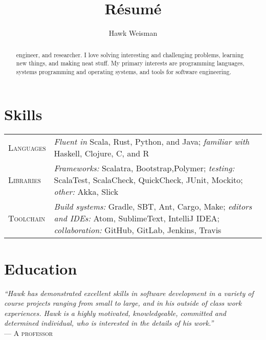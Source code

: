 \documentclass[a4paper]{tufte-handout}
\title{R{\'e}sum{\'e}}
\author[Hawk Weisman]{Hawk Weisman}
\begin{document}
\maketitle


\begin{abstract}
\noindent
{} engineer, and researcher. I love solving interesting and challenging problems, learning new things, and making neat stuff. My primary interests are programming languages, systems programming and operating systems, and tools for software engineering.
\end{abstract}

\section{Skills}
\begin{fullwidth}
\noindent
\begin{tabular}{ l p{12.5cm} }
\textsc{Languages} & \emph{Fluent in} Scala, Rust, Python, and Java; \emph{familiar with} Haskell, Clojure, C, and R \\
\textsc{Libraries} & \emph{Frameworks:} Scalatra, Bootstrap,Polymer; \emph{testing:} ScalaTest, ScalaCheck, QuickCheck, JUnit, Mockito; \emph{other:} Akka, Slick \\
\textsc{Toolchain} & \emph{Build systems:} Gradle, SBT, Ant, Cargo, Make; \emph{editors and IDEs:} Atom, SublimeText, IntelliJ IDEA; \emph{collaboration:} GitHub, GitLab, Jenkins, Travis
\end{tabular}
\end{fullwidth}

\section{Education}
\begin{blockquote}
    {\footnotesize
    \emph{``Hawk has demonstrated excellent skills in software development in a variety of course projects ranging from small to large, and in his outside of class work experiences. Hawk is a highly motivated, knowledgeable, committed and determined individual, who is interested in the details of his work.''}\\
--- \textsc{A professor}}
\end{blockquote}
\end{document}
